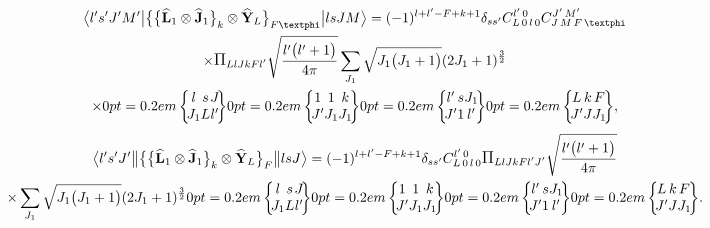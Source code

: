 \begin{multline}
\braOket{ l^{\prime} s^{\prime} J^{\prime} M^{\prime}}{\bigl\{\bigl\{\widehat{\vect{L}}_{1} \otimes \widehat{\vect{J}}_{1}\bigr\}_{k} \otimes \widehat{\vect{Y}}_{L}\bigr\}_{F \varphi}}{l s J M}=(-1)^{l+l^{\prime}-F+k+1} \delta_{s s^{\prime}} 
\clebsch{L}{0}{l}{0}{l^{\prime}}{0} 
\clebsch{J}{M}{F}{\varphi}{J^{\prime}}{M^{\prime}} \\
 \times \Fact{L l J k F l^{\prime}}\sqrt{\frac{ l^{\prime}\bigl(l^{\prime}+1\bigr)}{4 \pi}} \sum_{J_{1}} \sqrt{J_{1}\bigl(J_{1}+1\bigr)}(2 J_{1}+1)^{\frac{3}{2}} \\
 \times
\sixj{l}{s}{J}{J_{1}}{L}{l^{\prime}}
\sixj{1}{1}{k}{J^{\prime}}{J_{1}}{J_{1}}
\sixj{l^{\prime}}{s}{J_{1}}{J^{\prime}}{1}{l^{\prime}}
\sixj{L}{k}{F}{J^{\prime}}{J}{J_{1}},  \label{eq:13:2:145}
\end{multline}
\begin{multline*}
\braOketred{ l^{\prime} s^{\prime} J^{\prime}}{\bigl\{\bigl\{\widehat{\vect{L}}_{1} \otimes \widehat{\vect{J}}_{1}\bigr\}_{k} \otimes \widehat{\vect{Y}}_{L}\bigr\}_{F}}{l s J}=(-1)^{l+l^{\prime}-F+k+1} \delta_{s s^{\prime}}
\clebsch{L}{0}{l}{0}{l^{\prime}}{0}
\Fact{L l J k F l^{\prime} J^{\prime}}\sqrt{\frac{ l^{\prime}\bigl(l^{\prime}+1\bigr)}{4 \pi}} \\
\times \sum_{J_{1}} \sqrt{J_{1}\bigl(J_{1}+1\bigr)}(2 J_{1}+1)^{\frac{3}{2}}
\sixj{l}{s}{J}{J_{1}}{L}{l^{\prime}}
\sixj{1}{1}{k}{J^{\prime}}{J_{1}}{J_{1}}
\sixj{l^{\prime}}{s}{J_{1}}{J^{\prime}}{1}{l^{\prime}}
\sixj{L}{k}{F}{J^{\prime}}{J}{J_{1}}.
\end{multline*}

